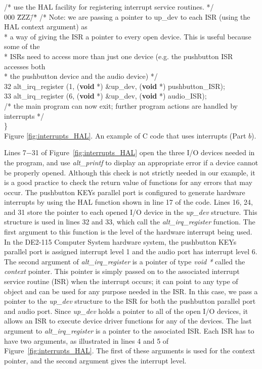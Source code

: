 \documentclass[11pt, twoside, pdftex]{article}
\begin{document}
\begin{table}
\begin{center}
\begin{minipage}[t]{12.5 cm}
\begin{tabbing}
\>\>/* use the HAL facility for registering interrupt service routines. */\\
000 \=ZZZ\=/\=* \kill
\>\>/* Note: we are passing a pointer to up\_dev to each ISR (using the HAL context argument) as \\
\>\>\>* a way of giving the ISR a pointer to every open device. This is useful because some of the\\
\>\>\>* ISRs need to access more than just one device (e.g. the pushbutton ISR accesses both\\
\>\>\>* the pushbutton device and the audio device) */\\
32 \>\>alt\_irq\_register (1, ({\bf void} *) \&up\_dev, ({\bf void} *) pushbutton\_ISR);\\
33 \>\>alt\_irq\_register (6, ({\bf void} *) \&up\_dev, ({\bf void} *) audio\_ISR);\\
\>\>/* the main program can now exit; further program actions are handled by interrupts */\\
\>\}\\
\>\>\>\>Figure \ref{fig:interrupts_HAL}.  An example of C code that uses interrupts (Part $b$).
\end{tabbing}
\end{minipage}
\end{center}
\end{table}

Lines 7$-$31 of Figure~\ref{fig:interrupts_HAL} open the three I/O devices needed in the program, and use {\it
alt\_printf} to display an appropriate error if a device cannot be properly opened. Although this check is not
strictly needed in our example, it is a good practice to check the return value of functions for any errors that
may occur. The pushbutton KEYs parallel port is configured to generate hardware interrupts by using the HAL 
function shown in line 17 of the code.  Lines 16, 24, and 31 store the pointer to each opened I/O device in 
the {\it up\_dev} structure. This structure is used in lines 32 and 33, which call the 
{\it alt\_irq\_register} function. The first argument to this function is the level of the hardware interrupt being
used. In the DE2-115 Computer System hardware system, the pushbutton KEYs parallel port is assigned interrupt level 1
and the audio port has interrupt level 6. The second argument of {\it alt\_irq\_register} is a pointer of type {\it
void *} called the {\it context} pointer. This pointer is simply passed on to the associated interrupt service
routine (ISR) when the interrupt occurs; it can point to any type of object and can be used for any purpose 
needed in the ISR. 
In this case, we pass a pointer to the {\it up\_dev} structure to the ISR for both the pushbutton parallel port and
audio port. Since {\it up\_dev} holds a pointer to all of the open I/O devices, it allows an ISR to execute device
driver functions for any of the devices. The last argument to {\it alt\_irq\_register} is a pointer to the 
associated ISR. Each ISR has to have two arguments, as illustrated in lines 4 and 5 of
Figure~\ref{fig:interrupts_HAL}. The first of these arguments is used for the context pointer, and the second
argument gives the interrupt level.
\end{document}
